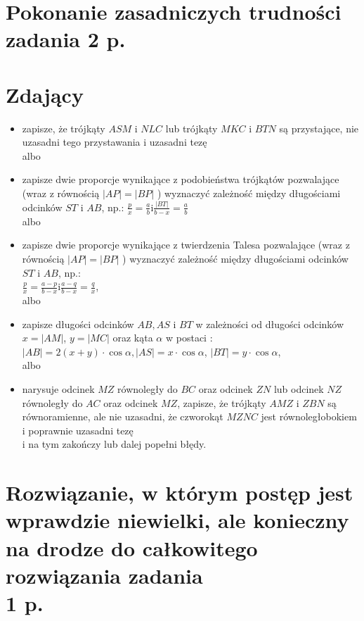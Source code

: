 \documentclass[10pt]{article}
\begin{document}
\section*{Pokonanie zasadniczych trudności zadania 2 p.}
\section*{Zdający}
\begin{itemize}
  \item zapisze, że trójkąty $A S M$ i $N L C$ lub trójkąty $M K C$ i $B T N$ są przystające, nie uzasadni tego przystawania i uzasadni tezę\\
albo
  \item zapisze dwie proporcje wynikające z podobieństwa trójkątów pozwalające (wraz z równością $|A P|=|B P|$ ) wyznaczyć zależność między długościami odcinków $S T$ i $A B$, np.: $\frac{p}{x}=\frac{a}{b} \mathrm{i} \frac{|B T|}{b-x}=\frac{a}{b}$\\
albo
  \item zapisze dwie proporcje wynikające z twierdzenia Talesa pozwalające (wraz z równością $|A P|=|B P|$ ) wyznaczyć zależność między długościami odcinków $S T$ i $A B$, np.:\\
$\frac{p}{x}=\frac{a-p}{b-x} \mathrm{i} \frac{a-q}{b-x}=\frac{q}{x}$,\\
albo
  \item zapisze długości odcinków $A B, A S$ i $B T$ w zależności od długości odcinków $x=|A M|$, $y=|M C|$ oraz kąta $\alpha$ w postaci : $|A B|=2(x+y) \cdot \cos \alpha,|A S|=x \cdot \cos \alpha$, $|B T|=y \cdot \cos \alpha$,\\
albo
  \item narysuje odcinek $M Z$ równoległy do $B C$ oraz odcinek $Z N$ lub odcinek $N Z$ równoległy do $A C$ oraz odcinek $M Z$, zapisze, że trójkąty $A M Z$ i $Z B N$ są równoramienne, ale nie uzasadni, że czworokąt $M Z N C$ jest równoległobokiem i poprawnie uzasadni tezę\\
i na tym zakończy lub dalej popełni błędy.
\end{itemize}

\section*{Rozwiązanie, w którym postęp jest wprawdzie niewielki, ale konieczny na drodze do całkowitego rozwiązania zadania \\
 1 p.}
\end{document}
